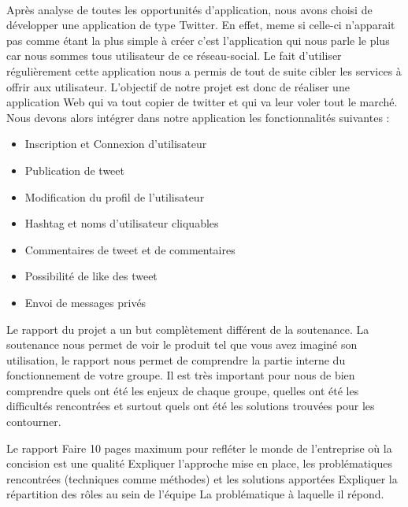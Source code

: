\documentclass[a4paper, 12pt]{article}
\begin{document}
	\paragraph{}
 Après analyse de toutes les opportunités d'application, nous avons choisi de développer une application de type Twitter. En effet, meme si celle-ci n'apparait pas comme étant la plus simple à créer c'est l'application qui nous parle le plus car nous sommes tous utilisateur de ce réseau-social.
	    Le fait d'utiliser régulièrement cette application nous a permis de tout de suite cibler les services à offrir aux utilisateur.
		L'objectif de notre projet est donc de réaliser une application Web qui va tout copier de twitter et qui va leur voler tout le marché. Nous devons alors intégrer dans notre application les fonctionnalités suivantes : 
\begin{itemize}
\item Inscription et Connexion d'utilisateur
\item Publication de tweet 
\item Modification du profil de l'utilisateur
\item Hashtag et noms d'utilisateur cliquables
\item Commentaires de tweet et de commentaires
\item Possibilité de like des tweet
\item Envoi de messages privés
\end{itemize}



Le rapport du projet a un but complètement différent de la soutenance. La soutenance nous permet de voir le produit tel que vous avez imaginé son utilisation, le rapport nous permet de comprendre la partie interne du fonctionnement de votre groupe. Il est très important pour nous de bien comprendre quels ont été les enjeux de chaque groupe, quelles ont été les difficultés rencontrées et surtout quels ont été les solutions trouvées pour les contourner.


Le rapport
Faire 10 pages maximum pour refléter le monde de l’entreprise où la concision est une qualité
Expliquer l’approche mise en place, les problématiques rencontrées (techniques comme méthodes) et les solutions apportées
Expliquer la répartition des rôles au sein de l’équipe
La problématique à laquelle il répond.
\end{document}
